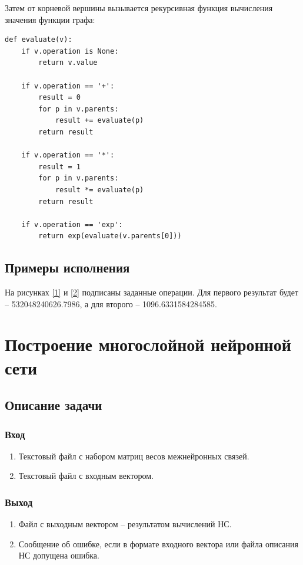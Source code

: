 \documentclass[bachelor, och, pract_otchet]{SCWorks}
\begin{document}
Затем от корневой вершины вызывается рекурсивная функция вычисления значения функции графа:
\begin{verbatim}
def evaluate(v):
    if v.operation is None:
        return v.value

    if v.operation == '+':
        result = 0
        for p in v.parents:
            result += evaluate(p)
        return result

    if v.operation == '*':
        result = 1
        for p in v.parents:
            result *= evaluate(p)
        return result

    if v.operation == 'exp':
        return exp(evaluate(v.parents[0]))
\end{verbatim}

\subsection{Примеры исполнения}
На рисунках \ref{1} и \ref{2} подписаны заданные операции. Для первого результат будет --
532048240626.7986, а для второго -- 1096.6331584284585.

\section{Построение многослойной нейронной сети}
\subsection{Описание задачи}
\subsubsection{Вход}
\begin{enumerate}
  \item Текстовый файл с набором матриц весов межнейронных связей.
  \item Текстовый файл с входным вектором.
\end{enumerate}

\subsubsection{Выход}
\begin{enumerate}
  \item Файл с выходным вектором – результатом вычислений НС.
  \item Сообщение об ошибке, если в формате входного вектора или файла описания НС допущена ошибка.
\end{enumerate}
\end{document}
